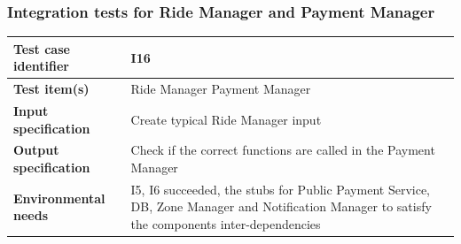 \documentclass[a4paper,11pt]{report} %
\begin{document}
		\subsubsection{Integration tests for Ride Manager and Payment Manager} \label{sec:3.1.13}
			\begin{minipage}{\linewidth}
			\end{minipage}		
		\begin{center}
			\renewcommand{\arraystretch}{1.2}
			\setlength{\tabcolsep}{24pt}
			\begin{tabular}{ l  p{9cm}}\hline
				\textbf{Test case identifier} & I16\\\hline
				\textbf{Test item(s)} & Ride Manager \textrightarrow Payment Manager\\\hline
				\textbf{Input specification} & Create typical Ride Manager input \\\hline
				\textbf{Output specification} & Check if the correct functions are called in the Payment Manager\\\hline
				\textbf{Environmental needs} & I5, I6 succeeded, the stubs for Public Payment Service, DB, Zone Manager and Notification Manager to satisfy the components inter-dependencies\\\hline
			\end{tabular}
		\end{center}

		\pagebreak
\end{document}
